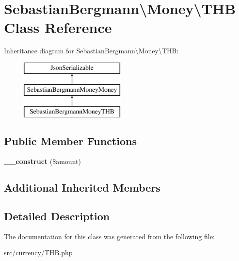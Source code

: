 \hypertarget{classSebastianBergmann_1_1Money_1_1THB}{}\section{Sebastian\+Bergmann\textbackslash{}Money\textbackslash{}T\+H\+B Class Reference}
\label{classSebastianBergmann_1_1Money_1_1THB}
Inheritance diagram for Sebastian\+Bergmann\textbackslash{}Money\textbackslash{}T\+H\+B\+:\begin{figure}[H]
\begin{center}
\leavevmode
\includegraphics[height=3.000000cm]{classSebastianBergmann_1_1Money_1_1THB}
\end{center}
\end{figure}
\subsection*{Public Member Functions}
\begin{DoxyCompactItemize}
\item 
\hypertarget{classSebastianBergmann_1_1Money_1_1THB_a6f03b3dda81b32fbf1f2c8c7c783e4a1}{}{\bfseries \+\_\+\+\_\+construct} (\$amount)\label{classSebastianBergmann_1_1Money_1_1THB_a6f03b3dda81b32fbf1f2c8c7c783e4a1}

\end{DoxyCompactItemize}
\subsection*{Additional Inherited Members}


\subsection{Detailed Description}


The documentation for this class was generated from the following file\+:\begin{DoxyCompactItemize}
\item 
src/currency/T\+H\+B.\+php\end{DoxyCompactItemize}
